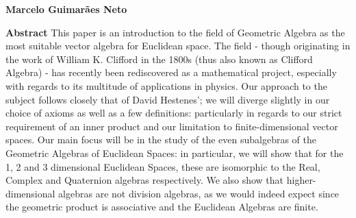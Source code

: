 \thispagestyle{plain}
\begin{center}
    \Large
    \textbf{\thtitle}
        
    \vspace{0.4cm}
    \large
	\thsubtitle

    \vspace{0.4cm}
    \textbf{Marcelo Guimarães Neto}
       
    \vspace{0.9cm}
    \textbf{Abstract}
	This paper is an introduction to the field of Geometric Algebra as the most suitable vector algebra for Euclidean space. The field - though originating in the work of William K. Clifford in the 1800s (thus also known as Clifford Algebra) - has recently been rediscovered as a mathematical project, especially with regards to its multitude of applications in physics. Our approach to the subject follows closely that of David Hestenes'; we will diverge slightly in our choice of axioms as well as a few definitions: particularly in regards to our strict requirement of an inner product and our limitation to finite-dimensional vector spaces. Our main focus will be in the study of the even subalgebras of the Geometric Algebras of Euclidean Spaces: in particular, we will show that for the 1, 2 and 3 dimensional Euclidean Spaces, these are isomorphic to the Real, Complex and Quaternion algebras respectively. We also show that higher-dimensional algebras are not division algebras, as we would indeed expect since the geometric product is associative and the Euclidean Algebras are finite.
\end{center}

